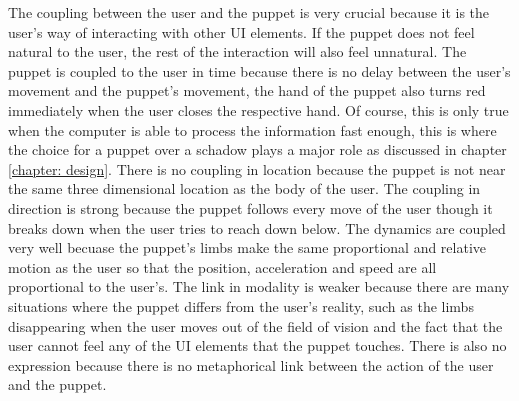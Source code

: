 The coupling between the user and the puppet is very crucial because it is the user's way of interacting with other UI elements. If the puppet does not feel natural to the user, the rest of the interaction will also  feel unnatural.  The puppet is coupled to the user in time because there is no delay between the user's movement and the puppet's movement, the hand of the puppet also turns red immediately when the user closes the respective hand. Of course, this is only true when the computer is able to process the information fast enough, this is where the choice for a puppet over a schadow plays a major role as discussed in chapter \ref{chapter: design}. There is no coupling in location because the puppet is not near the same three dimensional location as the body of the user. The coupling in direction is strong because the puppet follows every move of the user though it breaks down when the user tries to reach down below.  The dynamics are coupled very well becuase the puppet's limbs make the\textsc{} same proportional and relative motion as the user so that the position, acceleration and speed are all proportional to the user's. The link in modality is weaker because there are many situations where the puppet differs from the user's reality, such as the limbs disappearing when the user moves out of the field of vision and the fact that the user cannot feel any of the UI elements that the puppet touches. There is also no expression because there is no metaphorical link between the action of the user and the puppet.\\




